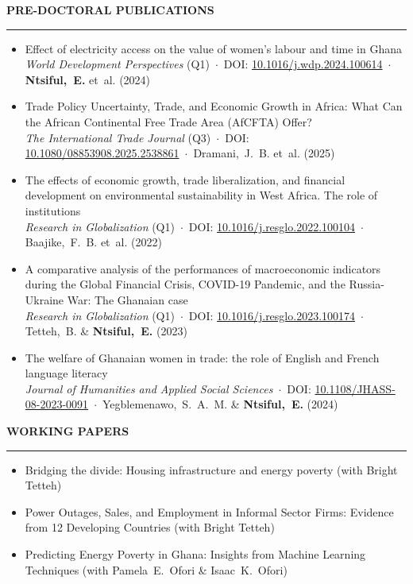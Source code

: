 \documentclass{resume} %
\def\sectionskip{\vspace{4pt}}
\def\sectionlineskip{\smallskip}
\renewenvironment{rSection}[1]{%
  \sectionskip
  \MakeUppercase{{\bf #1}}%
  \sectionlineskip
  \hrule
  \begin{list}{}{\setlength{\leftmargin}{0em}\setlength{\topsep}{5pt}\setlength{\itemsep}{0pt}\setlength{\parsep}{0pt}}%
  \item[]
}{%
  \end{list}
}
\newcommand{\pub}[4]{\item #1\\ {\small #2 \,$\cdot$\, DOI: \href{https://doi.org/#3}{#3} \,$\cdot$\, #4}}
\begin{document}
\begin{rSection}{Pre-Doctoral Publications}
\raggedright
\begin{itemize}
\pub{Effect of electricity access on the value of women’s labour and time in Ghana}{\textit{World Development Perspectives} (Q1)}{10.1016/j.wdp.2024.100614}{\textbf{Ntsiful,~E.} et~al. (2024)}
\pub{Trade Policy Uncertainty, Trade, and Economic Growth in Africa: What Can the African Continental Free Trade Area (AfCFTA) Offer?}{\textit{The International Trade Journal} (Q3)}{10.1080/08853908.2025.2538861}{Dramani,~J.~B. et~al. (2025)}
\pub{The effects of economic growth, trade liberalization, and financial development on environmental sustainability in West Africa. The role of institutions}{\textit{Research in Globalization} (Q1)}{10.1016/j.resglo.2022.100104}{Baajike,~F.~B. et~al. (2022)}
\pub{A comparative analysis of the performances of macroeconomic indicators during the Global Financial Crisis, COVID-19 Pandemic, and the Russia-Ukraine War: The Ghanaian case}{\textit{Research in Globalization} (Q1)}{10.1016/j.resglo.2023.100174}{Tetteh,~B. \& \textbf{Ntsiful,~E.} (2023)}
\pub{The welfare of Ghanaian women in trade: the role of English and French language literacy}{\textit{Journal of Humanities and Applied Social Sciences}}{10.1108/JHASS-08-2023-0091}{Yegblemenawo,~S.~A.~M. \& \textbf{Ntsiful,~E.} (2024)}
\end{itemize}
\end{rSection}


\begin{rSection}{Working Papers}
\begin{itemize}
\item Bridging the divide: Housing infrastructure and energy poverty (with Bright Tetteh)
\item Power Outages, Sales, and Employment in Informal Sector Firms: Evidence from 12 Developing Countries (with Bright Tetteh)
\item Predicting Energy Poverty in Ghana: Insights from Machine Learning Techniques (with Pamela~E.~Ofori \& Isaac~K.~Ofori)
\end{itemize}
\end{rSection}
\end{document}
